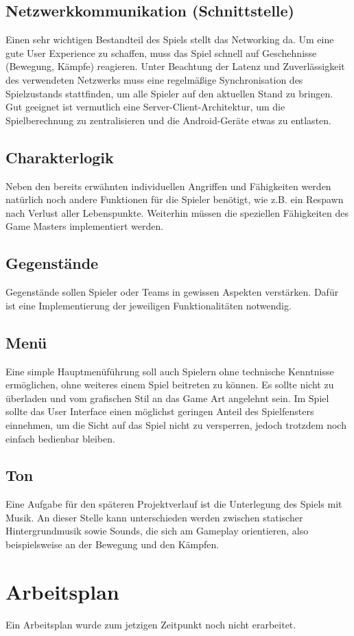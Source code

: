 \documentclass[10pt,a4paper,notitlepage]{report}
\begin{document}
\begin{flushleft}
\subsection{Netzwerkkommunikation (Schnittstelle)}
Einen sehr wichtigen Bestandteil des Spiels stellt das Networking da. Um eine gute User Experience zu schaffen, muss das Spiel schnell auf Geschehnisse (Bewegung, Kämpfe) reagieren. Unter Beachtung der Latenz und Zuverlässigkeit des verwendeten Netzwerks muss eine regelmäßige Synchronisation des Spielzustands stattfinden, um alle Spieler auf den aktuellen Stand zu bringen. Gut geeignet ist vermutlich eine Server-Client-Architektur, um die Spielberechnung zu zentralisieren und die Android-Geräte etwas zu entlasten. 

\subsection{Charakterlogik} 
Neben den bereits erwähnten individuellen Angriffen und Fähigkeiten werden natürlich noch andere Funktionen für die Spieler benötigt, wie z.B. ein Respawn nach Verlust aller Lebenspunkte. Weiterhin müssen die speziellen Fähigkeiten des Game Masters implementiert werden.

\subsection{Gegenstände}
Gegenstände sollen Spieler oder Teams in gewissen Aspekten verstärken. Dafür ist eine Implementierung der jeweiligen Funktionalitäten notwendig.

\subsection{Menü}
Eine simple Hauptmenüführung soll auch Spielern ohne technische Kenntnisse ermöglichen, ohne weiteres einem Spiel beitreten zu können. Es sollte nicht zu überladen und vom grafischen Stil an das Game Art angelehnt sein. Im Spiel sollte das User Interface einen möglichst geringen Anteil des Spielfensters einnehmen, um die Sicht auf das Spiel nicht zu versperren, jedoch trotzdem noch einfach bedienbar bleiben. 

\subsection{Ton} 
Eine Aufgabe für den späteren Projektverlauf ist die Unterlegung des Spiels mit Musik. An dieser Stelle kann unterschieden werden zwischen statischer Hintergrundmusik sowie Sounds, die sich am Gameplay orientieren, also beispielsweise an der Bewegung und den Kämpfen.

\section{Arbeitsplan}
Ein Arbeitsplan wurde zum jetzigen Zeitpunkt noch nicht erarbeitet.


\end{flushleft}
\end{document}
